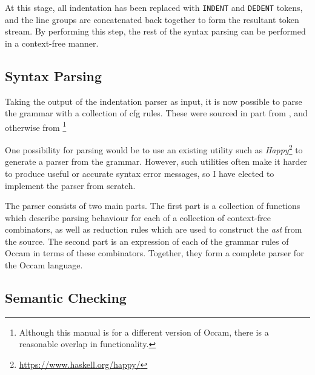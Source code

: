 At this stage, all indentation has been replaced with \texttt{INDENT} and
\texttt{DEDENT} tokens, and the line groups are concatenated back together to
form the resultant token stream. By performing this step, the rest of the syntax
parsing can be performed in a context-free manner.

\subsection{Syntax Parsing}

Taking the output of the indentation parser as input, it is now possible to
parse the grammar with a collection of \gls{cfg} rules. These were sourced in
part from \cite[p.~124]{jones}, and otherwise from
\cite[p.~106]{occ21}\footnote{Although this manual is for a different version of
Occam, there is a reasonable overlap in functionality.}

One possibility for parsing would be to use an existing utility such as
\textit{Happy}\footnote{\url{https://www.haskell.org/happy/}} to generate a
parser from the grammar. However, such utilities often make it harder to produce
useful or accurate syntax error messages, so I have elected to implement the
parser from scratch.

The parser consists of two main parts. The first part is a collection of
functions which describe parsing behaviour for each of a collection of
context-free combinators, as well as reduction rules which are used to construct
the \textit{\gls{ast}} from the source. The second part is an expression of each
of the grammar rules of Occam in terms of these combinators. Together, they form
a complete parser for the Occam language.

\subsection{Semantic Checking}

